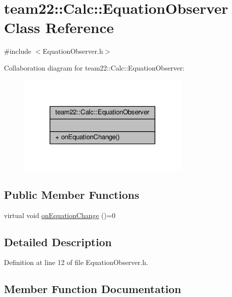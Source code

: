 \hypertarget{classteam22_1_1_calc_1_1_equation_observer}{}\section{team22\+:\+:Calc\+:\+:Equation\+Observer Class Reference}
\label{classteam22_1_1_calc_1_1_equation_observer}


{\ttfamily \#include $<$Equation\+Observer.\+h$>$}



Collaboration diagram for team22\+:\+:Calc\+:\+:Equation\+Observer\+:
\nopagebreak
\begin{figure}[H]
\begin{center}
\leavevmode
\includegraphics[width=239pt]{classteam22_1_1_calc_1_1_equation_observer__coll__graph}
\end{center}
\end{figure}
\subsection*{Public Member Functions}
\begin{DoxyCompactItemize}
\item 
virtual void \hyperlink{classteam22_1_1_calc_1_1_equation_observer_a2fc2a1f8583f27b0087ff6053895ef25}{on\+Equation\+Change} ()=0
\end{DoxyCompactItemize}


\subsection{Detailed Description}


Definition at line 12 of file Equation\+Observer.\+h.



\subsection{Member Function Documentation}
\mbox{\label{classteam22_1_1_calc_1_1_equation_observer_a2fc2a1f8583f27b0087ff6053895ef25}} 
